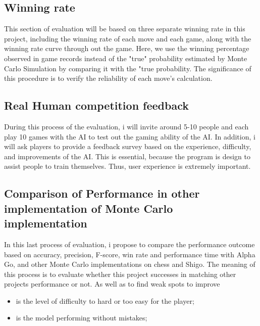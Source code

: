 \documentclass[10pt,twocolumn]{article}
\begin{document}
\subsection{Winning rate}
    This section of evaluation will be based on three separate winning rate in this project, including the winning rate of each move and each game, along with the winning rate curve through out the game. Here, we use the winning percentage observed in game records instead of the "true" probability estimated by Monte Carlo Simulation by comparing it with the "true probability\cite{}. The significance of this procedure is to verify the reliability of each move's calculation. 
\subsection{Real Human competition feedback}
    During this process of the evaluation, i will invite around 5-10 people and each play 10 games with the AI to test out the gaming ability of the AI. In addition, i will ask players to provide a feedback survey based on the experience, difficulty, and improvements of the AI. This is essential, because the program is design to assist people to train themselves. Thus, user experience is extremely important. 
    
\subsection{Comparison of Performance in other implementation of Monte Carlo implementation}
    In this last process of evaluation, i propose to compare the performance outcome based on accuracy, precision, F-score, win rate and performance time with Alpha Go, and other Monte Carlo implementations on chess and Shigo. The meaning of this process is to evaluate whether  this project successes in matching other projects performance or not. As well as to find weak spots to improve\cite{Accuracy}
\begin{itemize}
    \item is the level of difficulty to hard or too easy for the player; 
    \item is the model performing without mistakes;
\end{itemize}
    
\end{document}
